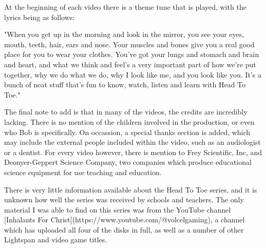 At the beginning of each video there is a theme tune that is played, with the lyrics being as follows:

"When you get up in the morning and look in the mirror, you see your eyes, mouth, teeth, hair, ears and nose. Your muscles and bones give you a real good place for you to wear your clothes. You've got your lungs and stomach and brain and heart, and what we think and feel's a very important part of how we're put together, why we do what we do, why I look like me, and you look like you. It's a bunch of neat stuff that's fun to know, watch, listen and learn with Head To Toe."

The final note to add is that in many of the videos, the credits are incredibly lacking. There is no mention of the children involved in the production, or even who Bob is specifically. On occassion, a special thanks section is added, which may include the external people included within the video, such as an audiologist or a dentist. For every video however, there is mention to Frey Scientific, Inc, and Deonyer-Geppert Science Company, two companies which produce educational science equipment for use teaching and education.

There is very little information available about the Head To Toe series, and it is unknown how well the series was received by schools and teachers. The only material I was able to find on this series was from the YouTube channel [Inhalants For Christ](https://www.youtube.com/@volcelgaming), a channel which has uploaded all four of the disks in full, as well as a number of other Lightspan and video game titles.